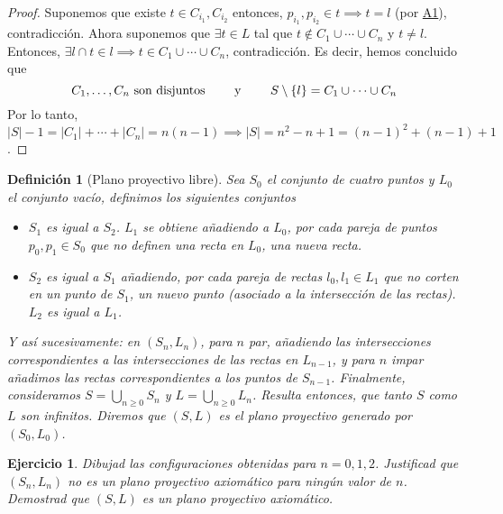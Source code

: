 \documentclass[12pt,a4paper]{article}
\newcommand{\abs}[1]{\left\vert #1 \right\vert}
\newcommand{\myref}[1]{\hyperref[item:a#1]{\uppercase{a#1}}}
\theoremstyle{break}
\newtheorem{ej}{Ejercicio}
\newtheorem{defi}{Definición}
\newtheorem*{proof}{Solución}
\begin{document}
\begin{proof}
	Suponemos que existe $t \in C_{i_1},C_{i_2}$ entonces,
	$p_{i_1}, p_{i_2} \in t \implies t=l$ (por \myref{1}), contradicción.
	Ahora suponemos que $\exists t \in L$ tal que
	$t \notin C_1 \cup \cdots \cup C_n$ y $t \neq l$. Entonces,
	$\exists l \cap t \in l \implies t \in C_1 \cup \cdots \cup C_n$,
	contradicción. Es decir, hemos concluido que
	\[
		C_1,\dots,C_n \text{ son disjuntos \qquad y \qquad}
		S \setminus \{l\} = C_1 \cup \cdots \cup C_n
	\]
	Por lo tanto, $\abs{S}-1 = \abs{C_1} + \cdots + \abs{C_n} =
	n(n-1) \implies \abs{S} = n^2-n+1 = (n-1)^2 + (n-1) + 1$.
\end{proof}

\begin{defi}[Plano proyectivo libre]
	Sea $S_0$ el conjunto de cuatro puntos y $L_0$ el conjunto vacío, definimos
	los siguientes conjuntos
	\begin{itemize}
		\item $S_1$ es igual a $S_2$. $L_1$ se obtiene añadiendo a $L_0$, por
			cada pareja de puntos$p_0,p_1 \in S_0$ que no definen una
			recta en $L_0$, una nueva recta.
		\item $S_2$ es igual a $S_1$ añadiendo, por cada pareja de rectas
			$l_0,l_1 \in L_1$ que no corten en un punto de $S_1$, un nuevo
			punto (asociado a la intersección de las rectas).
			$L_2$ es igual a $L_1$.
	\end{itemize}
	Y así sucesivamente: en $(S_n,L_n)$, para $n$ par, añadiendo las intersecciones
	correspondientes a las intersecciones de las rectas en $L_{n-1}$, y para $n$
	impar añadimos las rectas correspondientes a los puntos de $S_{n-1}$.
	Finalmente, consideramos $S = \bigcup\limits_{n \geq 0} S_n$ y 
	$L = \bigcup\limits_{n \geq 0} L_n$. Resulta entonces, que tanto $S$ como $L$
	son infinitos. Diremos que $(S,L)$ es el plano proyectivo generado por
	$(S_0,L_0)$.
\end{defi}

\begin{ej}\label{ej:3}
	Dibujad las configuraciones obtenidas para $n=0,1,2$. Justificad que
	$(S_n,L_n)$ no es un plano proyectivo axiomático para ningún valor de $n$.
	Demostrad que $(S,L)$ es un plano proyectivo axiomático.
\end{ej}
\end{document}
